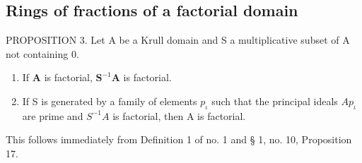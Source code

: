 \subsection{Rings of fractions of a factorial domain}

PROPOSITION 3. Let A be a Krull domain and S a multiplicative subset of A not containing 0.

\begin{enumerate}
\def\labelenumi{(\roman{enumi})}
\item
  If \(\mathbf{A}\) is factorial, \(\mathbf{S}^{-1}\mathbf{A}\) is factorial.
\item
  If S is generated by a family of elements \(p_{\iota}\) such that the principal ideals \(Ap_{\iota}\) are prime and \(S^{-1}A\) is factorial, then A is factorial.
\end{enumerate}

This follows immediately from Definition 1 of no. 1 and § 1, no. 10, Proposition 17.

